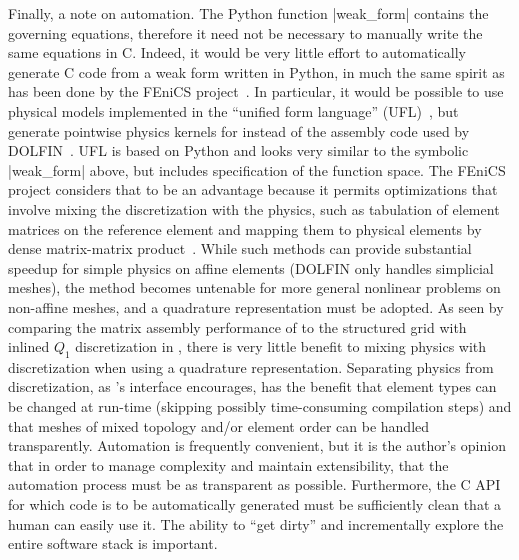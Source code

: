 Finally, a note on automation.
The Python function \pyverb|weak_form| contains the governing equations, therefore it need not be necessary to manually write the same equations in C.
Indeed, it would be very little effort to automatically generate C code from a weak form written in Python, in much the same spirit as has been done by the FEniCS project~\cite{fenicsproject}.
In particular, it would be possible to use physical models implemented in the ``unified form language'' (UFL)~\cite{alnaes2009unified}, but generate pointwise physics kernels for {\Dohp} instead of the assembly code used by DOLFIN~\cite{logg2010dolfin}.
UFL is based on Python and looks very similar to the symbolic \pyverb|weak_form| above, but includes specification of the function space.
The FEniCS project considers that to be an advantage because it permits optimizations that involve mixing the discretization with the physics, such as tabulation of element matrices on the reference element and mapping them to physical elements by dense matrix-matrix product~\cite{kirby2005optimizing}.
While such methods can provide substantial speedup for simple physics on affine elements (DOLFIN only handles simplicial meshes), the method becomes untenable for more general nonlinear problems on non-affine meshes, and a quadrature representation must be adopted.
As seen by comparing the matrix assembly performance of {\Dohp} to the structured grid with inlined $Q_1$ discretization in , there is very little benefit to mixing physics with discretization when using a quadrature representation.
Separating physics from discretization, as \Dohp's interface encourages, has the benefit that element types can be changed at run-time (skipping possibly time-consuming compilation steps) and that meshes of mixed topology and/or element order can be handled transparently.
Automation is frequently convenient, but it is the author's opinion that in order to manage complexity and maintain extensibility, that the automation process must be as transparent as possible.
Furthermore, the C API for which code is to be automatically generated must be sufficiently clean that a human can easily use it.
The ability to ``get dirty'' and incrementally explore the entire software stack is important.
